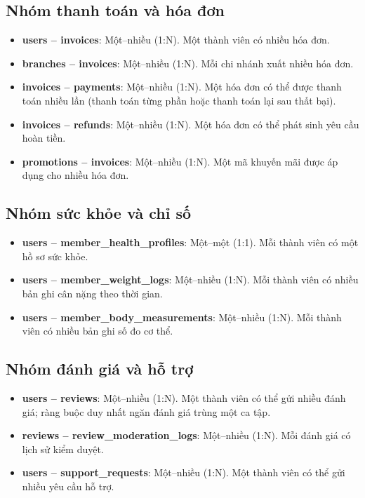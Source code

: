 \subsection*{Nhóm thanh toán và hóa đơn}
\begin{itemize}
    \item \textbf{users – invoices}: Một–nhiều (1:N). Một thành viên có nhiều hóa đơn.
    \item \textbf{branches – invoices}: Một–nhiều (1:N). Mỗi chi nhánh xuất nhiều hóa đơn.
    \item \textbf{invoices – payments}: Một–nhiều (1:N). Một hóa đơn có thể được thanh toán nhiều lần (thanh toán từng phần hoặc thanh toán lại sau thất bại).
    \item \textbf{invoices – refunds}: Một–nhiều (1:N). Một hóa đơn có thể phát sinh yêu cầu hoàn tiền.
    \item \textbf{promotions – invoices}: Một–nhiều (1:N). Một mã khuyến mãi được áp dụng cho nhiều hóa đơn.
\end{itemize}

\subsection*{Nhóm sức khỏe và chỉ số}
\begin{itemize}
    \item \textbf{users – member\_health\_profiles}: Một–một (1:1). Mỗi thành viên có một hồ sơ sức khỏe.
    \item \textbf{users – member\_weight\_logs}: Một–nhiều (1:N). Mỗi thành viên có nhiều bản ghi cân nặng theo thời gian.
    \item \textbf{users – member\_body\_measurements}: Một–nhiều (1:N). Mỗi thành viên có nhiều bản ghi số đo cơ thể.
\end{itemize}

\subsection*{Nhóm đánh giá và hỗ trợ}
\begin{itemize}
    \item \textbf{users – reviews}: Một–nhiều (1:N). Một thành viên có thể gửi nhiều đánh giá; ràng buộc duy nhất ngăn đánh giá trùng một ca tập.
    \item \textbf{reviews – review\_moderation\_logs}: Một–nhiều (1:N). Mỗi đánh giá có lịch sử kiểm duyệt.
    \item \textbf{users – support\_requests}: Một–nhiều (1:N). Một thành viên có thể gửi nhiều yêu cầu hỗ trợ.
\end{itemize}

